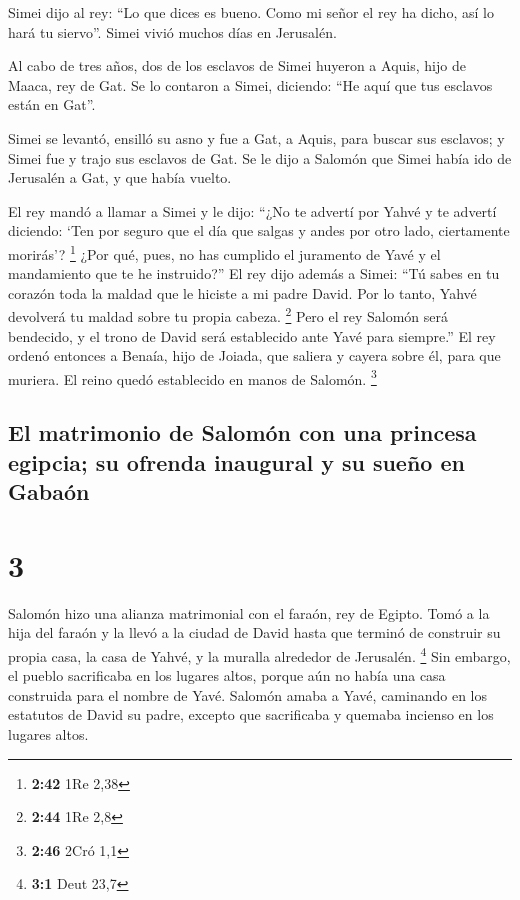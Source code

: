  Simei dijo al rey: ``Lo que dices es bueno. Como mi
señor el rey ha dicho, así lo hará tu siervo''. Simei vivió muchos días
en Jerusalén.

 Al cabo de tres años, dos de los esclavos de Simei
huyeron a Aquis, hijo de Maaca, rey de Gat. Se lo contaron a Simei,
diciendo: ``He aquí que tus esclavos están en Gat''.

 Simei se levantó, ensilló su asno y fue a Gat, a Aquis,
para buscar sus esclavos; y Simei fue y trajo sus esclavos de Gat.
 Se le dijo a Salomón que Simei había ido de Jerusalén a
Gat, y que había vuelto.

 El rey mandó a llamar a Simei y le dijo: ``¿No te
advertí por Yahvé y te advertí diciendo: `Ten por seguro que el día que
salgas y andes por otro lado, ciertamente morirás'? \footnote{\textbf{2:42}
  1Re 2,38}  ¿Por qué, pues, no has cumplido el juramento
de Yavé y el mandamiento que te he instruido?''  El rey
dijo además a Simei: ``Tú sabes en tu corazón toda la maldad que le
hiciste a mi padre David. Por lo tanto, Yahvé devolverá tu maldad sobre
tu propia cabeza. \footnote{\textbf{2:44} 1Re 2,8}  Pero
el rey Salomón será bendecido, y el trono de David será establecido ante
Yavé para siempre.''  El rey ordenó entonces a Benaía,
hijo de Joiada, que saliera y cayera sobre él, para que muriera. El
reino quedó establecido en manos de Salomón. \footnote{\textbf{2:46}
  2Cró 1,1}

\hypertarget{el-matrimonio-de-salomuxf3n-con-una-princesa-egipcia-su-ofrenda-inaugural-y-su-sueuxf1o-en-gabauxf3n}{%
\subsection{El matrimonio de Salomón con una princesa egipcia; su
ofrenda inaugural y su sueño en
Gabaón}\label{el-matrimonio-de-salomuxf3n-con-una-princesa-egipcia-su-ofrenda-inaugural-y-su-sueuxf1o-en-gabauxf3n}}

\hypertarget{section-2}{%
\section{3}\label{section-2}}

 Salomón hizo una alianza matrimonial con el faraón, rey
de Egipto. Tomó a la hija del faraón y la llevó a la ciudad de David
hasta que terminó de construir su propia casa, la casa de Yahvé, y la
muralla alrededor de Jerusalén. \footnote{\textbf{3:1} Deut 23,7}
 Sin embargo, el pueblo sacrificaba en los lugares altos,
porque aún no había una casa construida para el nombre de Yavé.
 Salomón amaba a Yavé, caminando en los estatutos de David
su padre, excepto que sacrificaba y quemaba incienso en los lugares
altos.

